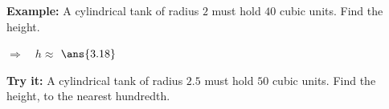 \documentclass[12pt]{article}
\begin{document}
\begin{examplebox}
\textbf{Example:} \quad A cylindrical tank of radius $2$ must hold $40$ cubic units. Find the height.

$\Rightarrow\quad h \approx$ $\ans{3.18}$
\end{examplebox}

\begin{tryitbox}
\textbf{Try it:} \quad A cylindrical tank of radius $2.5$ must hold $50$ cubic units. Find the height, to the nearest hundredth.\\[2pt]
\end{tryitbox}
\end{document}
